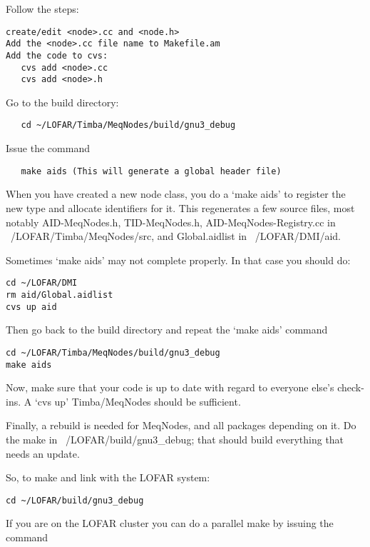 \documentclass[10pt]{article}
\begin{document}
Follow the steps:

\begin{verbatim}
create/edit <node>.cc and <node.h>
Add the <node>.cc file name to Makefile.am
Add the code to cvs:
   cvs add <node>.cc
   cvs add <node>.h
\end{verbatim}

Go to the build directory:
\begin{verbatim}
   cd ~/LOFAR/Timba/MeqNodes/build/gnu3_debug
\end{verbatim}

Issue the command

\begin{verbatim}
   make aids (This will generate a global header file)
\end{verbatim}

When you have created a new node class, you do a `make aids' to 
register the new type and allocate identifiers for
it. This regenerates a few source files, most notably
AID-MeqNodes.h, TID-MeqNodes.h, AID-MeqNodes-Registry.cc 
in ~/LOFAR/Timba/MeqNodes/src, and Global.aidlist in
~/LOFAR/DMI/aid. 

Sometimes `make aids' may not complete properly. In that case you
should do:

\begin{verbatim}
cd ~/LOFAR/DMI
rm aid/Global.aidlist
cvs up aid
\end{verbatim}

Then go back to the build directory and repeat the `make aids' command

\begin{verbatim}
cd ~/LOFAR/Timba/MeqNodes/build/gnu3_debug
make aids
\end{verbatim}

Now, make sure that your code is up to date with regard to everyone 
else's check-ins.  A `cvs up' Timba/MeqNodes should be sufficient.

Finally, a rebuild is needed for MeqNodes, and all packages 
depending on it. Do the make in ~/LOFAR/build/gnu3\_debug; that 
should build everything that needs an update.

So, to make and link with the LOFAR system:

\begin{verbatim}
cd ~/LOFAR/build/gnu3_debug
\end{verbatim}

If you are on the LOFAR cluster you can do a parallel make by
issuing the command
\end{document}
